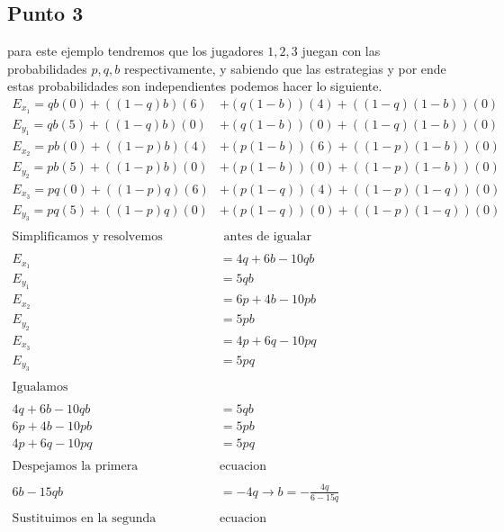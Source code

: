 \documentclass[11pt]{article}
\begin{document}
\subsection{Punto 3}
\begin{flushleft}
    para este ejemplo tendremos que los jugadores $1,2,3$ juegan con las probabilidades
    $p,q,b$ respectivamente, y sabiendo que las estrategias y por ende estas probabilidades son
    independientes podemos hacer lo siguiente.\\
    \begin{align*}
        E_{x_1}= qb(0)+((1-q)b)(6)&+(q(1-b))(4)+((1-q)(1-b))(0)\\
        E_{y_1}= qb(5)+((1-q)b)(0)&+(q(1-b))(0)+((1-q)(1-b))(0)\\
        E_{x_2}= pb(0)+((1-p)b)(4)&+(p(1-b))(6)+((1-p)(1-b))(0)\\
        E_{y_2}= pb(5)+((1-p)b)(0)&+(p(1-b))(0)+((1-p)(1-b))(0)\\
        E_{x_3}= pq(0)+((1-p)q)(6)&+(p(1-q))(4)+((1-p)(1-q))(0)\\
        E_{y_3}= pq(5)+((1-p)q)(0)&+(p(1-q))(0)+((1-p)(1-q))(0)\\~\\
        \text{Simplificamos y resolvemos}&\text{ antes de igualar}\\~\\
        E_{x_1}&=4q+6b-10qb\\
        E_{y_1}&=5qb\\
        E_{x_2}&=6p+4b-10pb\\
        E_{y_2}&=5pb\\
        E_{x_3}&=4p+6q-10pq\\
        E_{y_3}&=5pq\\~\\
        \text{Igualamos}\\~\\
        4q+6b-10qb&=5qb\\
        6p+4b-10pb&=5pb\\
        4p+6q-10pq&=5pq\\~\\
        \text{Despejamos la primera }& \text{ecuacion}\\~\\
        6b-15qb&=-4q \to b=-\frac{4q}{6-15q}\\~\\
        \text{Sustituimos en la segunda }& \text{ecuacion}\\~\\

\end{align*}
\end{flushleft}
\end{document}
